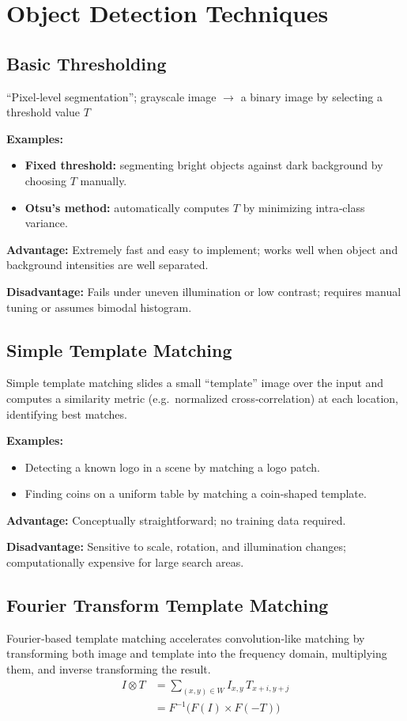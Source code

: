 \section*{Object Detection Techniques}

\subsection*{Basic Thresholding}
\enquote{Pixel‐level segmentation}; grayscale image $\rightarrow$ a binary image by selecting a threshold value \(T\)

\textbf{Examples:}
\begin{itemize}
  \item \textbf{Fixed threshold:} segmenting bright objects against dark background by choosing \(T\) manually.
  \item \textbf{Otsu's method:} automatically computes \(T\) by minimizing intra‐class variance.
\end{itemize}

\textbf{Advantage:} Extremely fast and easy to implement; works well when object and background intensities are well separated.

\textbf{Disadvantage:} Fails under uneven illumination or low contrast; requires manual tuning or assumes bimodal histogram.

\subsection*{Simple Template Matching}
Simple template matching slides a small “template” image over the input and computes a similarity metric (e.g.\ normalized cross‐correlation) at each location, identifying best matches.

\textbf{Examples:}
\begin{itemize}
  \item Detecting a known logo in a scene by matching a logo patch.
  \item Finding coins on a uniform table by matching a coin‐shaped template.
\end{itemize}

\textbf{Advantage:} Conceptually straightforward; no training data required.

\textbf{Disadvantage:} Sensitive to scale, rotation, and illumination changes; computationally expensive for large search areas.

\subsection*{Fourier Transform Template Matching}
Fourier‐based template matching accelerates convolution‐like matching by transforming both image and template into the frequency domain, multiplying them, and inverse transforming the result.
\begin{align*}
I \otimes T &= \sum_{(x,y)\in W} I_{x,y}\,T_{x+i,y+j} \\ 
&= F^{-1}\bigl(F(I)\times F(-T)\bigr)
\end{align*}

